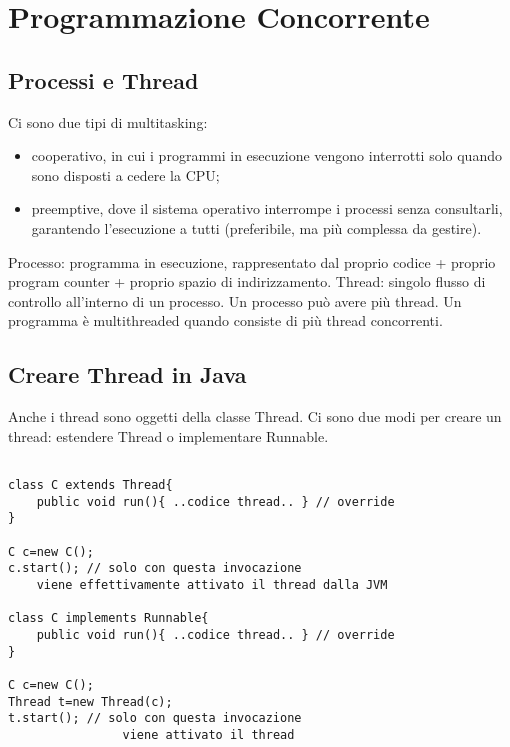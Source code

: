 \chapter{Programmazione Concorrente}

\section{Processi e Thread}
Ci sono due tipi di multitasking: 
\begin{itemize}
\item cooperativo, in cui i programmi in esecuzione vengono interrotti solo quando sono disposti a cedere la CPU;
\item preemptive, dove il sistema operativo interrompe i processi senza consultarli, garantendo l'esecuzione a tutti (preferibile, ma più complessa da gestire).
\end{itemize}

Processo: programma in esecuzione, rappresentato dal proprio codice + proprio program counter + proprio spazio di indirizzamento.
Thread: singolo flusso di controllo all'interno di un processo. Un processo può avere più thread. 
Un programma è multithreaded quando consiste di più thread concorrenti.

\section{Creare Thread in Java}
Anche i thread sono oggetti della classe Thread. Ci sono due modi per creare un thread: estendere Thread o implementare Runnable.

\begin{framed}
\begin{verbatim}

class C extends Thread{
    public void run(){ ..codice thread.. } // override
}

C c=new C();
c.start(); // solo con questa invocazione 
	viene effettivamente attivato il thread dalla JVM
	
class C implements Runnable{
    public void run(){ ..codice thread.. } // override
}

C c=new C();
Thread t=new Thread(c);
t.start(); // solo con questa invocazione
				viene attivato il thread 

\end{verbatim}
\end{framed}

